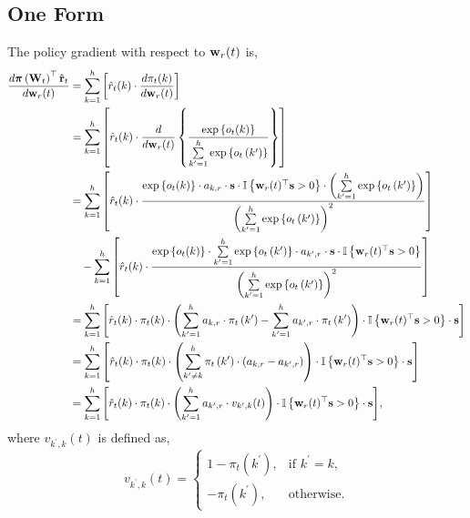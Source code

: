 \subsection{One Form}

The policy gradient with respect to ${\mathbf{w}}_r(t)$ is,
\begin{equation*}
\label{eq:gradient_form_one}
\begin{split}
	\frac{d {\boldsymbol{\pi}}\left( {\mathbf{W}}_t \right)^\top \hat{{\mathbf{r}}}_t}{d {\mathbf{w}}_r(t)} &=  \sum\limits_{k=1}^{h}\left[ \hat{r}_t(k) \cdot \frac{d \pi_t(k)}{d {\mathbf{w}}_r(t)} \right]  \\
	&= \sum\limits_{k=1}^{h}\left[ \hat{r}_t(k) \cdot \frac{d}{d {\mathbf{w}}_r(t)} \left\{ \frac{\exp\left\{ o_t(k) \right\}}{\sum\limits_{k^\prime = 1}^{h}{\exp\left\{ o_{t}\left(k^\prime\right) \right\}}} \right\} \right] \\
	&= \sum\limits_{k=1}^{h}\left[ \hat{r}_t(k) \cdot \frac{ \exp\left\{ o_t(k) \right\} \cdot a_{k,r} \cdot {\mathbf{s}} \cdot {\mathbb{I}}\left\{ {\mathbf{w}}_r(t)^\top {\mathbf{s}} > 0 \right\} \cdot \left( \sum\limits_{k^\prime = 1}^{h}{\exp\left\{ o_{t}\left(k^\prime\right) \right\}} \right) }{ \left( \sum\limits_{k^\prime = 1}^{h}{\exp\left\{ o_{t}\left(k^\prime\right) \right\}} \right)^2 } \right] \\
	&\quad -\sum\limits_{k=1}^{h}\left[ \hat{r}_t(k) \cdot \frac{ \exp\left\{ o_t(k) \right\} \cdot \sum\limits_{k^\prime = 1}^{h}{\exp\left\{ o_{t}\left(k^\prime\right) \right\}} \cdot a_{k^\prime,r} \cdot {\mathbf{s}} \cdot {\mathbb{I}}\left\{ {\mathbf{w}}_r(t)^\top {\mathbf{s}} > 0 \right\} }{ \left( \sum\limits_{k^\prime = 1}^{h}{\exp\left\{ o_{t}\left(k^\prime\right) \right\}} \right)^2 } \right] \\
	&= \sum\limits_{k=1}^{h}{ \left[ \hat{r}_t(k) \cdot \pi_t(k) \cdot \left( \sum\limits_{k^\prime = 1}^{h}{ a_{k,r} \cdot \pi_{t}\left(k^\prime\right) } - \sum\limits_{k^\prime = 1}^{h}{ a_{k^\prime,r} \cdot \pi_{t}\left(k^\prime\right) } \right) \cdot {\mathbb{I}}\left\{ {\mathbf{w}}_r(t)^\top {\mathbf{s}} > 0 \right\} \cdot {\mathbf{s}} \right] } \\
	&= \sum\limits_{k=1}^{h}{ \left[ \hat{r}_t(k) \cdot \pi_t(k) \cdot \left( \sum\limits_{k^\prime \not= k}^{h}{ \pi_{t}\left(k^\prime\right) \cdot \left( a_{k,r} - a_{k^\prime,r} \right)  } \right) \cdot {\mathbb{I}}\left\{ {\mathbf{w}}_r(t)^\top {\mathbf{s}} > 0 \right\} \cdot {\mathbf{s}} \right] } \\
	&= \sum\limits_{k=1}^{h}{ \left[ \hat{r}_t(k) \cdot \pi_t(k) \cdot \left( \sum\limits_{k^\prime = 1}^{h}{ a_{k^\prime,r}  \cdot v_{k^\prime,k}(t) } \right) \cdot {\mathbb{I}}\left\{ {\mathbf{w}}_r(t)^\top {\mathbf{s}} > 0 \right\} \cdot {\mathbf{s}} \right] },
\end{split}
\end{equation*}
where $v_{k^\prime,k}(t)$ is defined as,
\begin{equation*}
	v_{k^\prime,k}(t) = \begin{cases}
    1 - \pi_{t}\left(k^\prime\right), & \text{if $k^\prime = k$}, \\
    - \pi_{t}\left(k^\prime\right), & \text{otherwise}.
  \end{cases}
\end{equation*}

